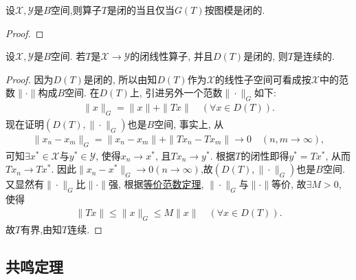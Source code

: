 \documentclass[../../main.tex]{subfiles}%
\begin{document}
\begin{proposition}
设$\mathscr{X},\mathscr{Y}$是$B$空间,则算子$T$是闭的当且仅当$G(T)$按图模是闭的.
\end{proposition}
\begin{proof}
\end{proof}

\begin{theorem}[闭图像定理]\label{theorem:泛函分析--闭图像定理}
设$\mathscr{X},\mathscr{Y}$是$B$空间. 若$T$是$\mathscr{X}\to\mathscr{Y}$的闭线性算子, 并且$D(T)$是闭的, 则$T$是连续的.
\end{theorem}
\begin{proof}
因为$D(T)$是闭的, 所以由知$D(T)$作为$\mathscr{X}$的线性子空间可看成按$\mathscr{X}$中的范数$\|\cdot\|$构成$B$空间. 在$D(T)$上, 引进另外一个范数$\|\cdot\|_G$如下:
\begin{align*}
\|x\|_G = \|x\| + \|Tx\| \quad (\forall x\in D(T)).
\end{align*}
现在证明$(D(T),\|\cdot\|_G)$也是$B$空间, 事实上, 从
\begin{align*}
\|x_n - x_m\|_G = \|x_n - x_m\| + \|Tx_n - Tx_m\| \to 0 \quad (n,m\to\infty),
\end{align*}
可知$\exists x^*\in\mathscr{X}$与$y^*\in\mathscr{Y}$, 使得$x_n\to x^*$, 且$Tx_n\to y^*$. 根据$T$的闭性即得$y^* = Tx^*$, 从而$Tx_n\to Tx^*$. 因此$\|x_n - x^*\|_G\to 0(n\to \infty)$,故$(D(T),\|\cdot\|_G)$也是$B$空间.
又显然有$\|\cdot\|_G$比$\|\cdot\|$强, 根据\hyperref[corollary:泛函分析--等价范数定理]{等价范数定理}, $\|\cdot\|_G$与$\|\cdot\|$等价, 故$\exists M>0$, 使得
\begin{align*}
\|Tx\| \leqslant \|x\|_G \leqslant M\|x\| \quad (\forall x\in D(T)).
\end{align*}
故$T$有界,由知$T$连续.
\end{proof}


\subsection{共鸣定理}
\end{document}

